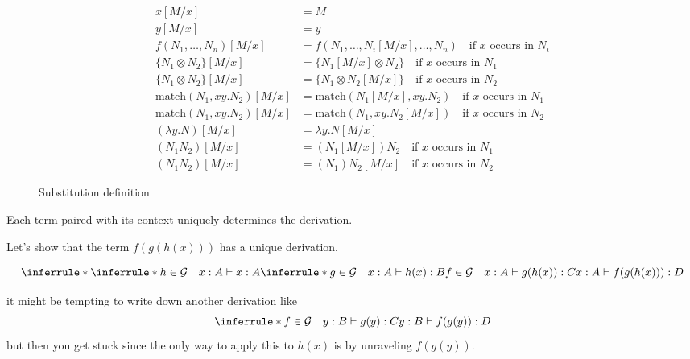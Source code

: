 \documentclass[acmsmall,screen, nonacm, anonymous]{acmart}
\begin{document}
\begin{figure}
\begin{align*}
x[M/x] &= M\\
y[M/x] &= y\\
f(N_1, \ldots, N_n)[M/x] &= f(N_1, \ldots, N_i[M/x], \ldots, N_n) \quad \text{if $x$ occurs in $N_i$}\\
\{N_1 \otimes N_2\}[M/x] &= \{N_1[M/x] \otimes N_2\} \quad \text{if $x$ occurs in $N_1$}\\
\{N_1 \otimes N_2\}[M/x] &= \{N_1 \otimes N_2[M/x]\} \quad \text{if $x$ occurs in $N_2$}\\
\text{match}(N_1,xy.N_2)[M/x] &= \text{match}(N_1[M/x], xy.N_2) \quad \text{if $x$ occurs in $N_1$}\\
\text{match}(N_1,xy.N_2)[M/x] &= \text{match}(N_1, xy.N_2[M/x]) \quad \text{if $x$ occurs in $N_2$}\\
(\lambda y . N)[M / x] &= \lambda y . N[M/x]\\
(N_1 N_2)[M / x] &= (N_1[M/x])N_2 \quad \text{if $x$ occurs in $N_1$}\\
(N_1 N_2)[M / x] &= (N_1)N_2[M/x] \quad \text{if $x$ occurs in $N_2$}
\end{align*}
\caption{Substitution definition}
\label{fig:sub-def}
\end{figure}

\begin{lemma}

Each term paired with its context uniquely determines the derivation.
\end{lemma}

\begin{example}
Let's show that the term $f(g(h(x)))$ has a unique derivation.

\[
\inferrule*{
  \inferrule*{h \in \mathcal{G} \quad x : A \vdash x : A}{
  \inferrule*{g \in \mathcal{G} \quad x : A \vdash h(x) : B}{f \in \mathcal{G} \quad x : A \vdash g(h(x)) : C}}}
{x : A \vdash f(g(h(x))) : D}
\]

it might be tempting to write down another derivation like
\[
\inferrule*{f \in \mathcal{G} \quad y : B \vdash g(y) : C}{y : B \vdash f(g(y)) : D}
\]
but then you get stuck since the only way to apply this to $h(x)$ is by unraveling $f(g(y))$.
\end{example}
\end{document}
